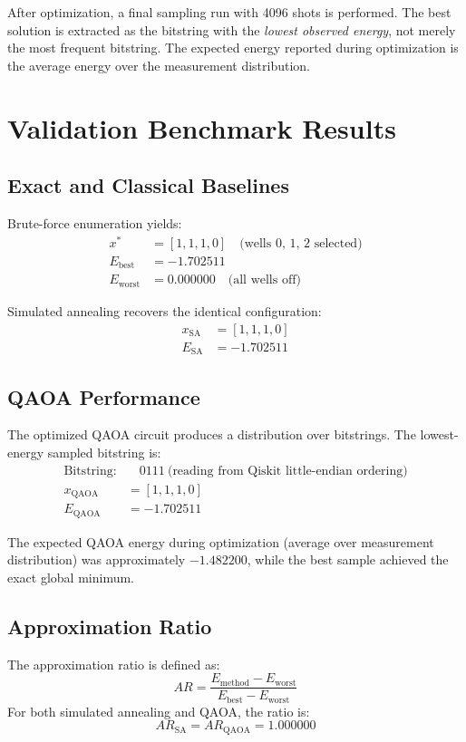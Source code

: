 \documentclass[12pt]{article}
\begin{document}
After optimization, a final sampling run with 4096 shots is performed. The best solution is extracted as the bitstring with the \emph{lowest observed energy}, not merely the most frequent bitstring. The expected energy reported during optimization is the average energy over the measurement distribution.

\section{Validation Benchmark Results}

\subsection{Exact and Classical Baselines}
Brute-force enumeration yields:
\begin{align*}
x^* &= [1, 1, 1, 0] \quad \text{(wells 0, 1, 2 selected)} \\
E_{\text{best}} &= -1.702511 \\
E_{\text{worst}} &= 0.000000 \quad \text{(all wells off)}
\end{align*}

Simulated annealing recovers the identical configuration:
\begin{align*}
x_{\text{SA}} &= [1, 1, 1, 0] \\
E_{\text{SA}} &= -1.702511
\end{align*}

\subsection{QAOA Performance}
The optimized QAOA circuit produces a distribution over bitstrings. The lowest-energy sampled bitstring is:
\begin{align*}
\text{Bitstring:} & \quad 0111 \ \text{(reading from Qiskit little-endian ordering)} \\
x_{\text{QAOA}} &= [1, 1, 1, 0] \\
E_{\text{QAOA}} &= -1.702511
\end{align*}

The expected QAOA energy during optimization (average over measurement distribution) was approximately \(-1.482200\), while the best sample achieved the exact global minimum.

\subsection{Approximation Ratio}
The approximation ratio is defined as:
\begin{equation}
AR = \frac{E_{\text{method}} - E_{\text{worst}}}{E_{\text{best}} - E_{\text{worst}}}
\label{eq:approx_ratio}
\end{equation}
For both simulated annealing and QAOA, the ratio is:
\begin{equation}
AR_{\text{SA}} = AR_{\text{QAOA}} = 1.000000
\end{equation}
\end{document}
